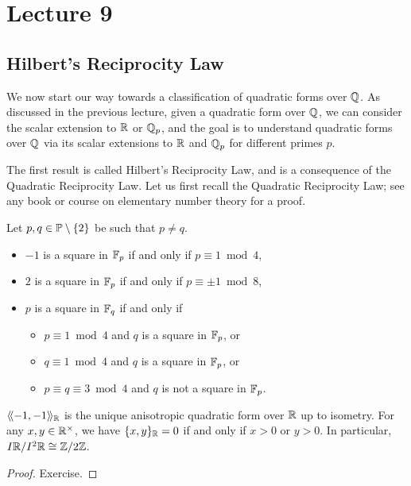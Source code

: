 \documentclass[12pt, leqno, british]{amsart}
\author{Nicolas Daans}
\begin{document}
\section{Lecture 9}

\subsection{Hilbert's Reciprocity Law}
We now start our way towards a classification of quadratic forms over $\mathbb Q$.
As discussed in the previous lecture, given a quadratic form over $\mathbb Q$, we can consider the scalar extension to $\mathbb R$ or $\mathbb Q_p$, and the goal is to understand quadratic forms over $\mathbb Q$ via its scalar extensions to $\mathbb R$ and $\mathbb Q_p$ for different primes $p$.

The first result is called Hilbert's Reciprocity Law, and is a consequence of the Quadratic Reciprocity Law.
Let us first recall the Quadratic Reciprocity Law; see any book or course on elementary number theory for a proof.
\begin{thm}\label{T:QuadraticReciprocity}
Let $p, q \in \mathbb P \setminus \lbrace 2 \rbrace$ be such that $p \neq q$.
\begin{itemize}
\item $-1$ is a square in $\mathbb F_p$ if and only if $p \equiv 1 \bmod 4$,
\item $2$ is a square in $\mathbb F_p$ if and only if $p \equiv \pm 1 \bmod 8$,
\item $p$ is a square in $\mathbb F_q$ if and only if
\begin{itemize}
\item $p \equiv 1 \bmod 4$ and $q$ is a square in $\mathbb F_p$, or
\item $q \equiv 1 \bmod 4$ and $q$ is a square in $\mathbb F_p$, or
\item $p \equiv q \equiv 3 \bmod 4$ and $q$ is not a square in $\mathbb F_p$.
\end{itemize}
\end{itemize}
\end{thm}
\begin{lem}\label{L:I2/I3R}
$\langle\!\langle -1, -1 \rangle\!\rangle_{\mathbb R}$ is the unique anisotropic quadratic form over $\mathbb R$ up to isometry.
For any $x, y \in \mathbb R^\times$, we have $\lbrace x, y \rbrace_{\mathbb R} = 0$ if and only if $x > 0$ or $y > 
0$.
In particular, $I\mathbb R/I^2\mathbb R \cong \mathbb Z/2\mathbb Z$.
\end{lem}
\begin{proof}
Exercise.
\end{proof}
\end{document}

